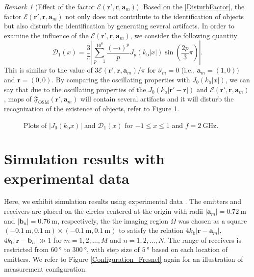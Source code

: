 \documentclass[3p,10pt]{elsarticle}
\newcommand{\kb}{k_{\mathrm{b}}}
\newcommand{\ma}{\mathbf{a}}
\newcommand{\mb}{\mathbf{b}}
\newcommand{\mr}{\mathbf{r}}
\DeclareMathOperator*{\osm}{OSM}
\theoremstyle{plain}
\theoremstyle{remark}
\newtheorem{remark}{Remark}[section]
\begin{document}
\begin{remark}[Effect of the factor $\mathcal{E}(\mr',\mr,\ma_m)$]\label{Remark3}
Based on the \eqref{DisturbFactor}, the factor $\mathcal{E}(\mr',\mr,\ma_m)$ not only does not contribute to the identification of objects but also disturb the identification by generating several artifacts. In order to examine the influence of the $\mathcal{E}(\mr',\mr,\ma_m)$, we consider the following quantity
\[\mathcal{D}_1(x)=\frac{3}{\pi}\left|\sum_{p=1}^{10^6}\frac{(-i)^p}{p}J_p(\kb|x|)\sin\left(\frac{2p}{3}\pi\right)\right|.\]
This is similar to the value of $3\mathcal{E}(\mr',\mr,\ma_m)/\pi$ for $\vartheta_m=0$ (i.e., $\ma_m=(1,0))$ and $\mr=(0,0)$. By comparing the oscillating properties with $J_0(\kb|x|)$, we can say that due to the oscillating properties of the $J_0(\kb|\mr'-\mr|)$ and $\mathcal{E}(\mr',\mr,\ma_m)$, maps of $\mathfrak{F}_{\osm}(\mr',\ma_m)$ will contain several artifacts and it will disturb the recognization of the existence of objects, refer to Figure \ref{FigureBessel1}.
\end{remark}

\begin{figure}[h]
\begin{center}
\caption{\label{FigureBessel1} Plots of $|J_0(\kb x)|$ and $\mathcal{D}_1(x)$ for $-1\leq x\leq1$ and $f=\SI{2}{\giga\hertz}$.}
\end{center}
\end{figure}

\section{Simulation results with experimental data}\label{sec:4}
Here, we exhibit simulation results using experimental data \cite{BS}. The emitters and receivers are placed on the circles centered at the origin with radii $|\ma_m|=\SI{0.72}{\meter}$ and $|\mb_n|=\SI{0.76}{\meter}$, respectively, the the imaging region $\Omega$ was chosen as a square $(-\SI{0.1}{\meter},\SI{0.1}{\meter})\times(-\SI{0.1}{\meter},\SI{0.1}{\meter})$ to satisfy the relation $4\kb|\mr-\ma_m|$, $4\kb|\mr-\mb_n|\gg1$ for $m=1,2,\ldots,M$ and $n=1,2,\ldots,N$. The range of receivers is restricted from $\SI{60}{\degree}$ to $\SI{300}{\degree}$, with step size of $\SI{5}{\degree}$ based on each location of emitters. We refer to Figure \ref{Configuration_Fresnel} again for an illustration of measurement configuration.
\end{document}
